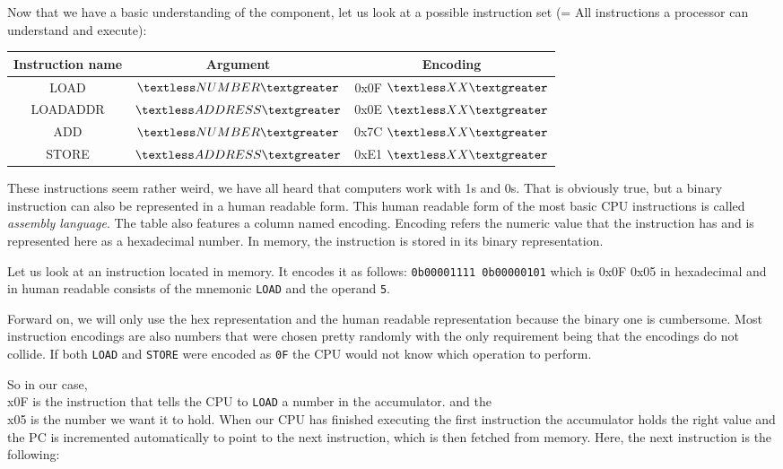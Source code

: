 Now that we have a basic understanding of the component, let us look at a possible instruction set
(= All instructions a processor can understand and execute):

\begin{center}
	\begin{tabular} { | c | c | c | }
	        Instruction name & Argument & Encoding \\
	        \hline
	        LOAD & $\textless NUMBER\textgreater$ & 0x0F $\textless XX\textgreater$  \\
	        LOADADDR & $\textless ADDRESS\textgreater$ & 0x0E $\textless XX\textgreater$  \\
	        ADD & $\textless NUMBER\textgreater$ & 0x7C $\textless XX\textgreater$  \\
	        STORE & $\textless ADDRESS\textgreater$ & 0xE1 $\textless XX\textgreater$ 
	\end{tabular}
\end{center}


These instructions seem rather weird, we have all heard that
computers work with 1s and 0s. That is obviously true, but a binary instruction
can also be represented in a human readable form. This human readable form of the
most basic CPU instructions is called \textit{assembly language}. The table also features
a column named encoding. Encoding refers the numeric value that the instruction has
and is represented here as a hexadecimal number. In memory, the instruction is 
stored in its binary representation.

Let us look at an instruction located in memory. It encodes it as follows: \texttt{0b00001111 0b00000101}
which is 0x0F 0x05 in hexadecimal and in human readable consists of the mnemonic
\texttt{LOAD} and the operand \texttt{5}.

Forward on, we will only use the hex representation and the human readable representation
because the binary one is cumbersome. Most instruction encodings are also numbers that were
chosen pretty randomly with the only requirement being that the encodings do not collide.
If both \texttt{LOAD} and \texttt{STORE} were encoded as \texttt{0F} the CPU would not know which operation to
perform.

So in our case, \\x0F is the instruction that tells the CPU to \texttt{LOAD} a number in the accumulator.
and the \\x05 is the number we want it to hold. When our CPU has finished executing the first
instruction the accumulator holds the right value and the PC is incremented automatically to point
to the next instruction, which is then fetched from memory. Here, the next instruction is the
following:

